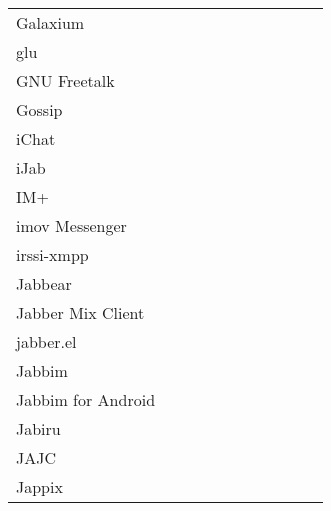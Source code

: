 \begin{table}[ht]
{{\begin{tabular}{ l c c c c c c c c c c}
Galaxium	& 		 & 		    & 		      & 		 & 		     & 			 &		\\
glu		& 		 & 		    & 		      & 		 & 		     & 			 &		\\
GNU Freetalk	& 		 & 		    & 		      & 		 & 		     & 			 &		\\
Gossip		& 		 & 		    & 		      & 		 & 		     & 			 &		\\
iChat		& 		 & 		    & 		      & 		 & 		     & 			 &		\\
iJab		& 		 & 		    & 		      & 		 & 		     & 			 &		\\
IM+		& 		 & 		    & 		      & 		 & 		     & 			 &		\\ 
imov Messenger	& 		 & 		    & 		      & 		 & 		     & 			 &		\\
irssi-xmpp	& 		 & 		    & 		      & 		 & 		     & 			 &		\\
Jabbear		& 		 & 		    & 		      & 		 & 		     & 			 &		\\
Jabber Mix Client& 		 & 		    & 		      & 		 & 		     & 			 &		\\
jabber.el	& 		 & 		    & 		      & 		 & 		     & 			 &		\\
Jabbim		& 		 & 		    & 		      & 		 & 		     & 			 &		\\
Jabbim for Android& 		 & 		    & 		      & 		 & 		     & 			 &		\\
Jabiru		& 		 & 		    & 		      & 		 & 		     & 			 &		\\
JAJC		& 		 & 		    & 		      & 		 & 		     & 			 &		\\
Jappix		& 		 & 		    & 		      & 		 & 		     & 			 &		\\ \hline
\end{tabular}} }
\end{table}



